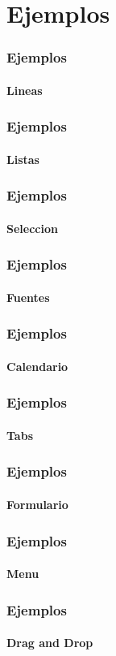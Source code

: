 \section{Ejemplos}
\begin{frame}[t,fragile]
\frametitle{Ejemplos}
\framesubtitle{Lineas}
\tiny
\lstset{language=Python}

\end{frame}


\begin{frame}[t,fragile]
\frametitle{Ejemplos}
\framesubtitle{Listas}
\tiny
\lstset{language=Python}

\end{frame}

\begin{frame}[t,fragile]
\frametitle{Ejemplos}
\framesubtitle{Seleccion}
\tiny
\lstset{language=Python}

\end{frame}


\begin{frame}[t,fragile]
\frametitle{Ejemplos}
\framesubtitle{Fuentes}
\tiny
\lstset{language=Python}

\end{frame}


\begin{frame}[t,fragile]
\frametitle{Ejemplos}
\framesubtitle{Calendario}
\tiny
\lstset{language=Python}

\end{frame}

\begin{frame}[t,fragile]
\frametitle{Ejemplos}
\framesubtitle{Tabs}
\tiny
\lstset{language=Python}

\end{frame}

\begin{frame}[t,fragile]
\frametitle{Ejemplos}
\framesubtitle{Formulario}
\tiny
\lstset{language=Python}

\end{frame}

\begin{frame}[t,fragile]
\frametitle{Ejemplos}
\framesubtitle{Menu}
\tiny
\lstset{language=Python}

\end{frame}

\begin{frame}[t,fragile]
\frametitle{Ejemplos}
\framesubtitle{Drag and Drop}
\tiny
\lstset{language=Python}

\end{frame}

